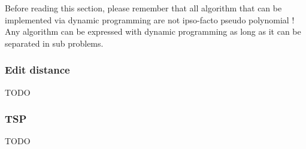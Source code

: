 Before reading this section, please remember that all algorithm that can be
implemented via dynamic programming are not ipso-facto pseudo polynomial ! Any
algorithm can be expressed with dynamic programming as long as it can be separated in
sub problems.

\subsubsection{Edit distance}


TODO

\subsubsection{TSP}
 
TODO

